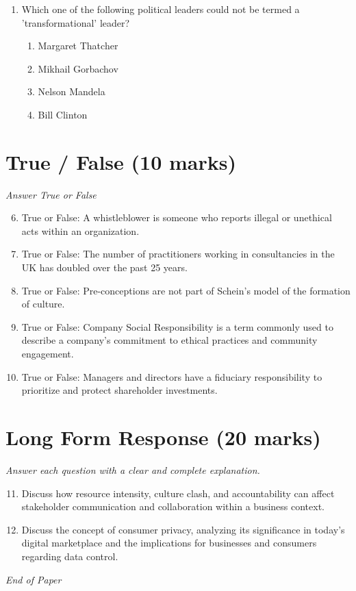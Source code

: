 \documentclass[12pt]{article}
\begin{document}
\begin{enumerate}[label=\arabic*.]
\begin{enumerate}[label=(\alph*)]
    \item Strengths, weaknesses, opportunities, threats.
    \item Strategy, work, openness, toughness.
    \item Strategy, weakness, opinions, tactics.
    \item Strategy, working, opinion, tactical.
\end{enumerate}
\item Which one of the following political leaders could not be termed a 'transformational' leader?
\begin{enumerate}[label=(\alph*)]
    \item Margaret Thatcher
    \item Mikhail Gorbachov
    \item Nelson Mandela
    \item Bill Clinton
\end{enumerate}
\end{enumerate}

\section*{True / False (10 marks)}
\textit{Answer True or False}
\begin{enumerate}[label=\arabic*.]
\setcounter{enumi}{5}
\item True or False: A whistleblower is someone who reports illegal or unethical acts within an organization.
\item True or False: The number of practitioners working in consultancies in the UK has doubled over the past 25 years.
\item True or False: Pre-conceptions are not part of Schein's model of the formation of culture.
\item True or False: Company Social Responsibility is a term commonly used to describe a company's commitment to ethical practices and community engagement.
\item True or False: Managers and directors have a fiduciary responsibility to prioritize and protect shareholder investments.
\end{enumerate}

\section*{Long Form Response (20 marks)}
\textit{Answer each question with a clear and complete explanation.}
\begin{enumerate}[label=\arabic*.]
\setcounter{enumi}{10}
\item Discuss how resource intensity, culture clash, and accountability can affect stakeholder communication and collaboration within a business context.
\item Discuss the concept of consumer privacy, analyzing its significance in today's digital marketplace and the implications for businesses and consumers regarding data control.
\end{enumerate}

\vfill
\noindent\textit{End of Paper}
\end{document}
